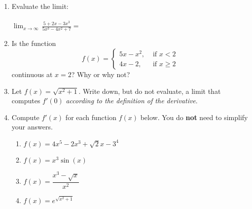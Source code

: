 \documentclass[12pt]{article}
\newcommand{\points}[1]{\marginpar{\hspace{24pt}[#1]}}
\newcommand{\di}{\displaystyle}
\begin{document}
 \begin{enumerate}
 \item  Evaluate the limit: \points{3}\\
 \\
$\di  \lim_{x\to \infty}\,\frac{5+2x-3x^3}{5x^3-4x^2+7}=$
 
 
 \vspace{2in}
 
 \item Is the function \points{3}
 \[
 f(x) = \begin{cases} 5x-x^2, & \text{ if } x<2\\ 4x-2, & \text{ if } x\geq 2\end{cases}
 \]
 continuous at $x=2$? Why or why not? 
 
 \vspace{3in}
 
 \item Let $f(x) = \sqrt{x^2+1}$. Write down, but do not evaluate, a limit that computes $f'(0)$ \textit{according to the definition of the derivative}. \points{2}
 
\newpage

\item Compute $f'(x)$ for each function $f(x)$ below. You do \textbf{not} need to simplify your answers.
\begin{enumerate}
\item $f(x) = 4x^5-2x^3+\sqrt{2}x-3^4$\points{2}

\vspace{1.5in}

\item $f(x) = x^3\sin(x)$ \points{2}

\vspace{1.75in}

\item $f(x) = \dfrac{x^3-\sqrt{x}}{x^2}$ \points{3}

\vspace{2in}

\item $\di f(x) = e^{\sqrt{x^2+1}}$ \points{3}
\end{enumerate}
\end{enumerate}
\end{document}
